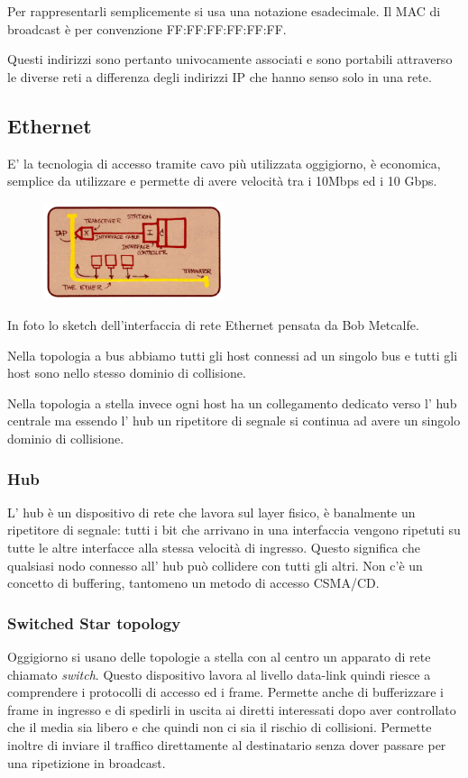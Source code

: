 Per rappresentarli semplicemente si usa una notazione esadecimale.
Il MAC di broadcast è per convenzione FF:FF:FF:FF:FF:FF.

Questi indirizzi sono pertanto univocamente associati e sono portabili attraverso le diverse reti a differenza degli indirizzi IP che hanno senso solo in una rete.

\subsection{Ethernet}
E' la tecnologia di accesso tramite cavo più utilizzata oggigiorno, è economica, semplice da utilizzare e permette di avere velocità tra i 10Mbps ed i 10 Gbps.

\begin{figure}[H]
    \centering
    \includegraphics[width=200px]{images/3_Reti_connessione_diretta/Metcalfe_ethernet.png}
\end{figure}
In foto lo sketch dell'interfaccia di rete Ethernet pensata da Bob Metcalfe.

Nella topologia a bus abbiamo tutti gli host connessi ad un singolo bus e tutti gli host sono nello stesso dominio di collisione.

Nella topologia a stella invece ogni host ha un collegamento dedicato verso l' hub centrale ma essendo l' hub un ripetitore di segnale si continua ad avere un singolo dominio di collisione.

\subsubsection{Hub}
L' hub è un dispositivo di rete che lavora sul layer fisico, è banalmente un ripetitore di segnale: tutti i bit che arrivano in una interfaccia vengono ripetuti su tutte le altre interfacce alla stessa velocità di ingresso.
Questo significa che qualsiasi nodo connesso all' hub può collidere con tutti gli altri.
Non c'è un concetto di buffering, tantomeno un metodo di accesso CSMA/CD.

\subsubsection{Switched Star topology}
Oggigiorno si usano delle topologie a stella con al centro un apparato di rete chiamato \emph{switch}.
Questo dispositivo lavora al livello data-link quindi riesce a comprendere i protocolli di accesso ed i frame.
Permette anche di bufferizzare i frame in ingresso e di spedirli in uscita ai diretti interessati dopo aver controllato che il media sia libero e che quindi non ci sia il rischio di collisioni.
Permette inoltre di inviare il traffico direttamente al destinatario senza dover passare per una ripetizione in broadcast.

